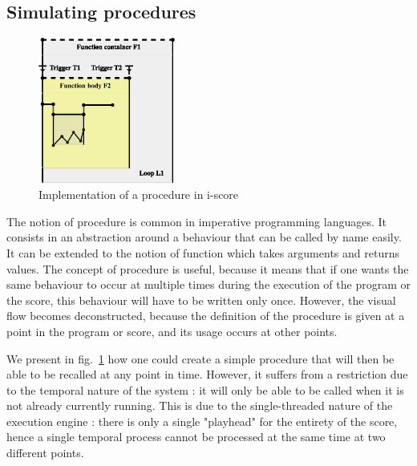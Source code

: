 \documentclass{article}
\begin{document}
\subsection{Simulating procedures}
\begin{figure}[h]
\centering
\includegraphics[width=0.40\textwidth]{images/function.eps}
\caption{Implementation of a procedure in i-score}
\label{fig.function}
\end{figure}

The notion of procedure is common in imperative programming languages.
It consists in an abstraction around a behaviour that can be called 
by name easily.
It can be extended to the notion of function which takes arguments 
and returns values.
The concept of procedure is useful, because it means that 
if one wants the same behaviour to occur at multiple times during
the execution of the program or the score, this behaviour will 
have to be written only once.
However, the visual flow becomes deconstructed, because 
the definition of the procedure is given at a point in the program or score, 
and its usage occurs at other points.

We present in fig.~\ref{fig.function} how one could create a simple 
procedure that will then be able to be recalled at any point in time.
However, it suffers from a restriction due to the temporal nature of the system : 
it will only be able to be called when it is not already currently running. 
This is due to the single-threaded nature of the execution engine : there is 
only a single "playhead" for the entirety of the score, hence a single 
temporal process cannot be processed at the same time at two different points.
\end{document}
